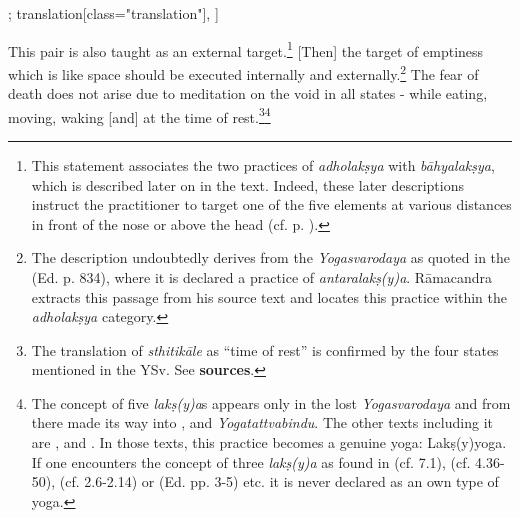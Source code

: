 \begin{alignment}[
  texts=edition[class="edition"];
  translation[class="translation"],
  ]
\begin{translation}
\begin{tlate}[p15_01]
This pair is also taught as an external target.\footnote{This statement associates the two practices of \textit{adholakṣya} with \textit{bāhyalakṣya}, which is described later on in the text. Indeed, these later descriptions instruct the practitioner to target one of the five elements at various distances in front of the nose or above the head (cf. p. \pageref{bahya2}).} [Then] the target of emptiness which is like space should be executed internally and externally.\footnote{The description undoubtedly derives from the \textit{Yogasvarodaya} as quoted in the  (Ed. p. 834), where it is declared a practice of \textit{antaralakṣ(y)a}. Rāmacandra extracts this passage from his source text and locates this practice within the \textit{adholakṣya} category.} The fear of death does not arise due to meditation on the void in all states - while eating, moving, waking [and] at the time of rest.\footnote{The translation of \textit{sthitikāle} as ``time of rest'' is confirmed by the four states mentioned in the YSv. See \textbf{sources}.}\footnote{The concept of five \textit{lakṣ(y)a}s appears only in the lost \textit{Yogasvarodaya} and from there made its way into ,  and \textit{Yogatattvabindu}. The other texts including it are ,  and . In those texts, this practice becomes a genuine yoga: Lakṣ(y)yoga. If one encounters the concept of three \textit{lakṣ(y)a} as found in  (cf. 7.1),  (cf. 4.36-50),  (cf. 2.6-2.14) or  (Ed. pp. 3-5) etc. it is never declared as an own type of yoga.}
    \end{tlate}
  \end{translation}
\end{alignment}
\pagebreak %
